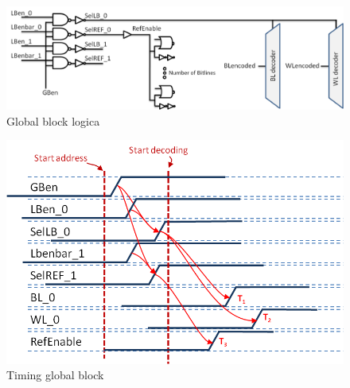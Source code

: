 \begin{figure}[!ht]
  \centering
  \includegraphics[scale=0.6]{../fig/hfdstk-timing-gb1.png}
  \caption{Global block logica}
  \label{fig:gb_timing1}
\end{figure}

\begin{figure}[!ht]
  \centering
  \includegraphics[scale=0.9]{../fig/hfdstk-timing-gb2.png}
  \caption{Timing global block}
  \label{fig:gb_timing2}
\end{figure}

